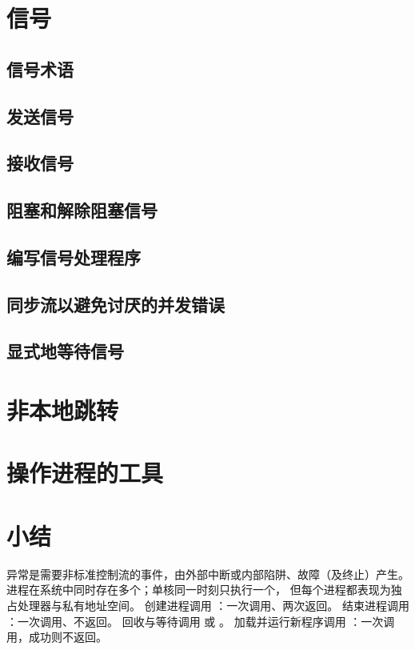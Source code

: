 \section{信号}

\pending

\subsection{信号术语}

\pending

\subsection{发送信号}

\pending

\subsection{接收信号}

\pending

\subsection{阻塞和解除阻塞信号}

\pending

\subsection{编写信号处理程序}

\pending

\subsection{同步流以避免讨厌的并发错误}

\pending

\subsection{显式地等待信号}

\pending

\section{非本地跳转}

\pending

\section{操作进程的工具}

\pending

\section{小结}

异常是需要非标准控制流的事件，由外部中断或内部陷阱、故障（及终止）产生。
进程在系统中同时存在多个；单核同一时刻只执行一个，
但每个进程都表现为独占处理器与私有地址空间。
创建进程调用 ：一次调用、两次返回。
结束进程调用 ：一次调用、不返回。
回收与等待调用  或 。
加载并运行新程序调用 ：一次调用，成功则不返回。
